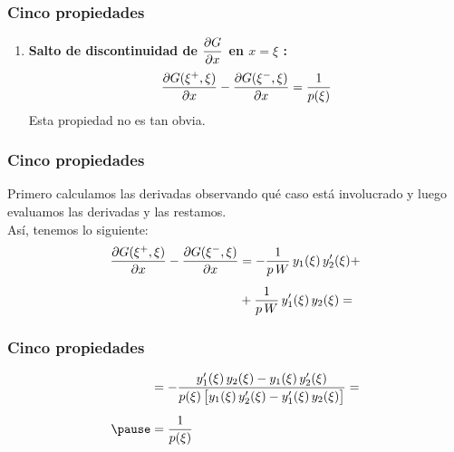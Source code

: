 \documentclass[12pt]{beamer}
\begin{document}
\begin{frame}
\frametitle{Cinco propiedades}
\begin{enumerate}[<+->]
\conti
\item \textbf{Salto de discontinuidad de $\displaystyle \pdv{G}{x}$ en $x = \xi$ :}
\pause
\begin{align*}
\pdv{G (\xi^{+}, \xi)}{x} - \pdv{G (\xi^{-}, \xi)}{x} = \dfrac{1}{p (\xi)}
\end{align*}
Esta propiedad no es tan obvia.
\seti
\end{enumerate}
\end{frame}
\begin{frame}
\frametitle{Cinco propiedades}
Primero calculamos las derivadas observando qué caso está involucrado y luego evaluamos las derivadas y las restamos.
\\
\bigskip
\pause
Así, tenemos lo siguiente:
\pause
\begin{eqnarray*}
\begin{aligned}[b]
\pdv{G (\xi^{+}, \xi)}{x} - \pdv{G (\xi^{-}, \xi)}{x} &= - \dfrac{1}{p \, W} \, y_{1} (\xi) \, {y}^{\prime}_{2} (\xi) + \\[0.5em]
&+ \dfrac{1}{p \, W} \, {y}^{\prime}_{1} (\xi) \, y_{2} (\xi) = 
\end{aligned}
\end{eqnarray*}
\end{frame}
\begin{frame}
\frametitle{Cinco propiedades}
\begin{eqnarray}
\begin{aligned}[b]
&= - \dfrac{\pderivada{y}_{1} (\xi) \, y_{2} (\xi) - y_{1} (\xi) \, \pderivada{y}_{2} (\xi)}{p (\xi) \, \big[ y_{1} (\xi) \, \pderivada{y}_{2} (\xi) - \pderivada{y}_{1} (\xi) \, y_{2} (\xi) \big]} = \\[0.5em] \pause
&= \dfrac{1}{p (\xi)}
\end{aligned}
\label{eq:ecuacion_07_37}
\end{eqnarray}
\end{frame}
\end{document}
